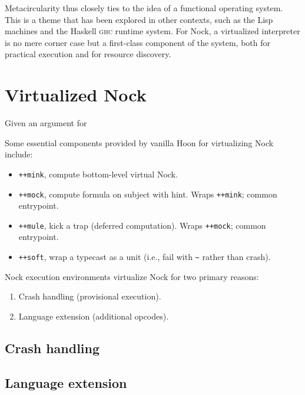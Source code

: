 \documentclass[twoside]{article}
\begin{document}
\noindent
Metacircularity thus closely ties to the idea of a functional operating system.  This is a theme that has been explored in other contexts, such as the Lisp machines and the Haskell \textsc{ghc} runtime system.  For Nock, a virtualized interpreter is no mere corner case but a first-class component of the system, both for practical execution and for resource discovery.


\section{Virtualized Nock}

Given an argument for


Some essential components provided by vanilla Hoon for virtualizing Nock include:

\begin{itemize}
  \item  \lstinline[style=inlinecode]{++mink}, compute bottom-level virtual Nock.
  \item  \lstinline[style=inlinecode]{++mock}, compute formula on subject with hint.  Wraps \lstinline[style=inlinecode]{++mink}; common entrypoint.
  \item  \lstinline[style=inlinecode]{++mule}, kick a trap (deferred computation).  Wraps \lstinline[style=inlinecode]{++mock}; common entrypoint.
  \item  \lstinline[style=inlinecode]{++soft}, wrap a typecast as a unit (i.e., fail with \lstinline[style=inlinecode]{~} rather than crash).
\end{itemize}

\noindent


Nock execution environments virtualize Nock for two primary reasons:

\begin{enumerate}
  \item  Crash handling (provisional execution).
  \item  Language extension (additional opcodes).
\end{enumerate}

\subsection{Crash handling}

\subsection{Language extension}
\end{document}
